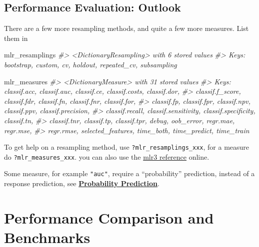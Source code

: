 \documentclass[]{article}
\newenvironment{Shaded}{\begin{snugshade}}{\end{snugshade}}
\newcommand{\CommentTok}[1]{\textcolor[rgb]{0.56,0.35,0.01}{\textit{#1}}}
\newcommand{\NormalTok}[1]{#1}
\begin{document}
\hypertarget{performance-evaluation-outlook}{%
\subsection{Performance Evaluation:
Outlook}\label{performance-evaluation-outlook}}

There are a few more resampling methods, and quite a few more measures.
List them in

\begin{Shaded}
\begin{Highlighting}[]
\NormalTok{mlr_resamplings}
\CommentTok{#> <DictionaryResampling> with 6 stored values}
\CommentTok{#> Keys: bootstrap, custom, cv, holdout, repeated_cv, subsampling}
\end{Highlighting}
\end{Shaded}

\begin{Shaded}
\begin{Highlighting}[]
\NormalTok{mlr_measures}
\CommentTok{#> <DictionaryMeasure> with 31 stored values}
\CommentTok{#> Keys: classif.acc, classif.auc, classif.ce, classif.costs, classif.dor,}
\CommentTok{#>   classif.f_score, classif.fdr, classif.fn, classif.fnr, classif.for,}
\CommentTok{#>   classif.fp, classif.fpr, classif.npv, classif.ppv, classif.precision,}
\CommentTok{#>   classif.recall, classif.sensitivity, classif.specificity, classif.tn,}
\CommentTok{#>   classif.tnr, classif.tp, classif.tpr, debug, oob_error, regr.mae, regr.mse,}
\CommentTok{#>   regr.rmse, selected_features, time_both, time_predict, time_train}
\end{Highlighting}
\end{Shaded}

To get help on a resampling method, use \texttt{?mlr\_resamplings\_xxx},
for a measure do \texttt{?mlr\_measures\_xxx}. you can also use the
\href{https://mlr3.mlr-org.com/reference/index.html}{mlr3 reference}
online.

Some measure, for example \texttt{"auc"}, require a ``probability''
prediction, instead of a response prediction, see
\protect\hyperlink{probability-prediction}{\textbf{Probability
Prediction}}.

\hypertarget{performance-comparison-and-benchmarks}{%
\section{Performance Comparison and
Benchmarks}\label{performance-comparison-and-benchmarks}}
\end{document}
